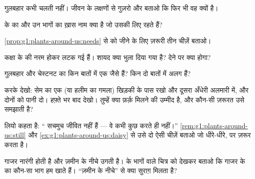 \begin{exercise}[$\star$]\label{exo:g1:plants-around-us:3}
गुलबहार कभी चलती नहीं। जीवन के लक्षणों से गुज़रो और बताओ कि फिर भी वह
 क्यों है।
\end{exercise}

\begin{exercise}[$\star$]\label{exo:g1:plants-around-us:4}
 के  का और उन भागों का ख़ास नाम क्या है जो उसकी  लिए
रहते हैं?
\end{exercise}

\begin{exercise}[$\star$]\label{exo:g1:plants-around-us:5}
\cref{prop:g1:plants-around-us:needs} से  को जीने के लिए ज़रूरी
तीन चीज़ें बताओ।
\end{exercise}

\begin{exercise}[$\star$]\label{exo:g1:plants-around-us:6}
कक्षा के  की  नरम होकर लटक गई हैं। शायद क्या भुला दिया
गया है? देने पर क्या होगा?
\end{exercise}

\begin{exercise}[$\star$]\label{exo:g1:plants-around-us:7}
गुलबहार और चेस्टनट का  किन बातों में एक जैसे हैं? किन दो बातों
में अलग हैं?
\end{exercise}

\begin{exercise}[$\star$]\label{exo:g1:plants-around-us:8}
करके देखो: सेम का एक  (या हलीम का गमला) खिड़की के पास रखो और
दूसरा अँधेरी अलमारी में, और दोनों को पानी दो। हफ़्ते भर बाद देखो।
तुम्हें क्या फ़र्क़ मिलने की उम्मीद है, और कौन-सी ज़रूरत उसे समझाती
है?
\end{exercise}

\begin{exercise}[$\star\star$]\label{exo:g1:plants-around-us:9}
लियो कहता है: `` सचमुच जीवित नहीं हैं --- वे कभी कुछ करते ही
नहीं।'' \cref{rem:g1:plants-around-us:still} और
\cref{ex:g1:plants-around-us:daisy} से उसे दो ऐसी चीज़ें बताओ जो 
धीरे-धीरे, पर ज़रूर करता है।
\end{exercise}

\begin{exercise}[$\star\star$]\label{exo:g1:plants-around-us:10}
गाजर नारंगी होती है और ज़मीन के नीचे उगती है।  के भागों वाले चित्र
को देखकर बताओ कि गाजर के  का कौन-सा भाग हम खाते हैं। ``ज़मीन के
नीचे'' से क्या सुराग़ मिलता है?
\end{exercise}
